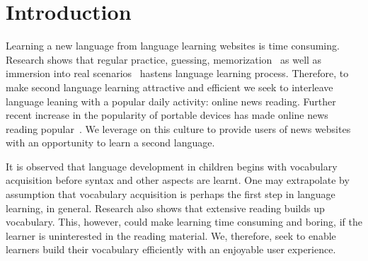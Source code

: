 \section{Introduction}
Learning a new language from language learning websites is 
time consuming. Research shows that regular practice, guessing, 
memorization~\cite{rubin91} as well as immersion into real scenarios~\cite{naiman78} hastens language learning process. 
Therefore, to make second language learning 
attractive and efficient we seek to interleave language leaning 
with a popular daily activity: online news reading.
Further recent increase in the popularity of 
portable devices has made online news reading popular~\cite{yarlh2012}. 
We leverage on this culture to provide users of news websites with an opportunity to learn a second language.

It is observed that language development in children begins with 
vocabulary acquisition before syntax and other aspects are learnt. One may 
extrapolate by assumption that vocabulary acquisition is perhaps the first step in language learning, in general. Research also shows that extensive reading builds up vocabulary. This, however, could make learning time consuming and boring, if the learner is uninterested in the reading material. We, therefore, seek to enable learners build 
their vocabulary efficiently with an enjoyable user experience.

